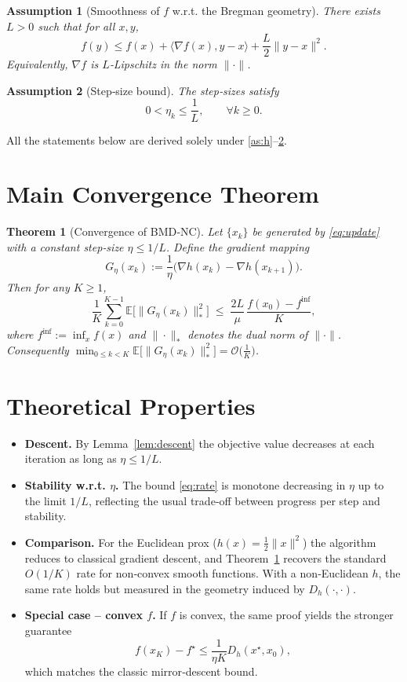 \documentclass{article}
\newtheorem{theorem}{Theorem}
\newtheorem{assumption}{Assumption}
\newcommand{\EE}{\mathbb{E}}
\newcommand{\grad}{\nabla}
\newcommand{\D}[2]{D_h(#1,#2)}
\begin{document}
\begin{assumption}[Smoothness of $f$ w.r.t. the Bregman geometry]
\label{as:f}
There exists $L>0$ such that for all $x,y$,
\[
f(y)\le f(x)+\langle\grad f(x),y-x\rangle+\frac{L}{2}\|y-x\|^{2}.
\tag{A2}
\]
Equivalently, $\grad f$ is $L$‑Lipschitz in the norm $\|\cdot\|$.
\end{assumption}

\begin{assumption}[Step‑size bound]
\label{as:eta}
The step‑sizes satisfy
\[
0<\eta_k\le \frac{1}{L},\qquad\forall k\ge0 .
\tag{A3}
\]
\end{assumption}

All the statements below are derived solely under \ref{as:h}–\ref{as:eta}.

\section*{Main Convergence Theorem}
\begin{theorem}[Convergence of BMD‑NC]
\label{thm:main}
Let $\{x_k\}$ be generated by \eqref{eq:update} with a constant step‑size $\eta\le 1/L$.
Define the \emph{gradient mapping}
\[
G_{\eta}(x_k):=\frac{1}{\eta}\bigl(\grad h(x_k)-\grad h(x_{k+1})\bigr).
\]
Then for any $K\ge 1$,
\begin{equation}
\label{eq:rate}
\frac{1}{K}\sum_{k=0}^{K-1}\EE\bigl[\|G_{\eta}(x_k)\|_{*}^{2}\bigr]
\;\le\;
\frac{2L}{\mu}\,\frac{f(x_0)-f^{\inf}}{K},
\end{equation}
where $f^{\inf}:=\inf_{x}f(x)$ and $\|\cdot\|_{*}$ denotes the dual norm of $\|\cdot\|$.
Consequently $\min_{0\le k<K}\EE\bigl[\|G_{\eta}(x_k)\|_{*}^{2}\bigr]=\mathcal{O}\!\bigl(\tfrac{1}{K}\bigr)$.
\end{theorem}

\section*{Theoretical Properties}
\begin{itemize}
\item \textbf{Descent.} By Lemma~\ref{lem:descent} the objective value decreases at each iteration as long as $\eta\le 1/L$.
\item \textbf{Stability w.r.t. $\eta$.} The bound \eqref{eq:rate} is monotone decreasing in $\eta$ up to the limit $1/L$, reflecting the usual trade‑off between progress per step and stability.
\item \textbf{Comparison.} For the Euclidean prox ($h(x)=\tfrac12\|x\|^{2}$) the algorithm reduces to classical gradient descent, and Theorem~\ref{thm:main} recovers the standard $O(1/K)$ rate for non‑convex smooth functions. With a non‑Euclidean $h$, the same rate holds but measured in the geometry induced by $\D{\cdot}{\cdot}$.
\item \textbf{Special case – convex $f$.} If $f$ is convex, the same proof yields the stronger guarantee
\[
f(x_K)-f^\star\le\frac{1}{\eta K}\D{x^\star}{x_0},
\]
which matches the classic mirror‑descent bound.
\end{itemize}
\end{document}
